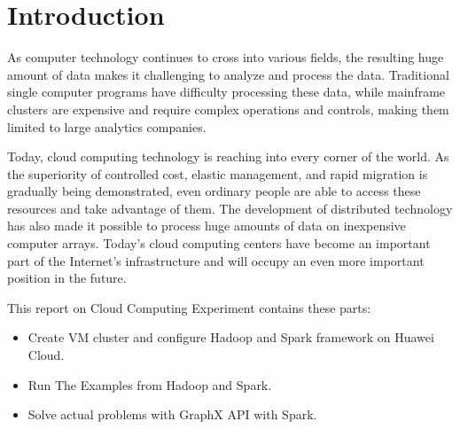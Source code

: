 \section{Introduction}
As computer technology continues to cross into various fields, the resulting huge amount of data makes it challenging to analyze and process the data. Traditional single computer programs have difficulty processing these data, while mainframe clusters are expensive and require complex operations and controls, making them limited to large analytics companies.

Today, cloud computing technology is reaching into every corner of the world. As the superiority of controlled cost, elastic management, and rapid migration is gradually being demonstrated, even ordinary people are able to access these resources and take advantage of them. The development of distributed technology has also made it possible to process huge amounts of data on inexpensive computer arrays. Today's cloud computing centers have become an important part of the Internet's infrastructure and will occupy an even more important position in the future.

This report on Cloud Computing Experiment contains these parts:

\begin{itemize}
    \item Create VM cluster and configure Hadoop and Spark framework on Huawei Cloud.
    \item Run The Examples from Hadoop and Spark.
    \item Solve actual problems with GraphX API with Spark.
\end{itemize}